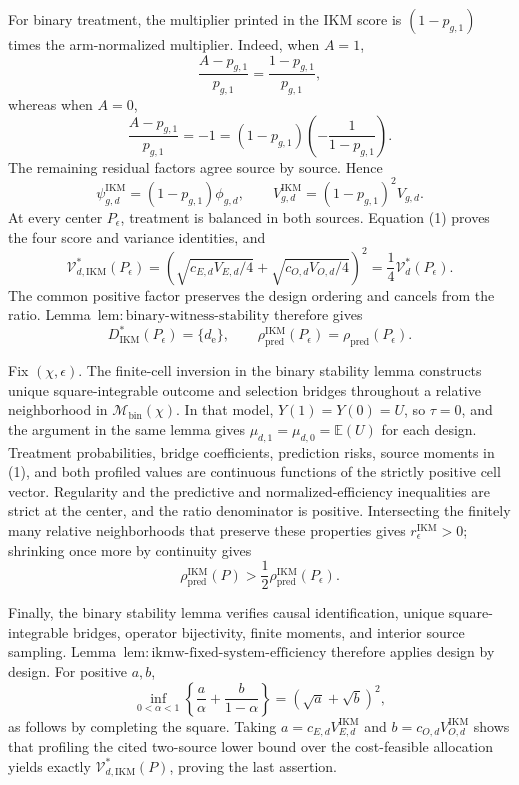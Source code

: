 For binary treatment, the multiplier printed in the IKM score is \((1-p_{g,1})\) times the arm-normalized multiplier. Indeed, when \(A=1\),
\[
 \frac{A-p_{g,1}}{p_{g,1}}=\frac{1-p_{g,1}}{p_{g,1}},
\]
whereas when \(A=0\),
\[
 \frac{A-p_{g,1}}{p_{g,1}}=-1
 =(1-p_{g,1})\left(-\frac1{1-p_{g,1}}\right).
\]
The remaining residual factors agree source by source. Hence
\[
 \psi_{g,d}^{\mathrm{IKM}}=(1-p_{g,1})\phi_{g,d},
 \qquad
 V_{g,d}^{\mathrm{IKM}}=(1-p_{g,1})^2V_{g,d}. \tag{1}
\]
At every center \(P_\epsilon\), treatment is balanced in both sources. Equation (1) proves the four score and variance identities, and
\[
 \mathcal V_{d,\mathrm{IKM}}^*(P_\epsilon)
 =\left(\sqrt{c_{E,d}V_{E,d}/4}
 +\sqrt{c_{O,d}V_{O,d}/4}\right)^2
 =\frac14\mathcal V_d^*(P_\epsilon). \tag{2}
\]
The common positive factor preserves the design ordering and cancels from the ratio. Lemma~\(\mathrm{lem{:}binary\text{-}witness\text{-}stability}\) therefore gives
\[
 D_{\mathrm{IKM}}^*(P_\epsilon)=\{d_{\mathrm e}\},
 \qquad
 \rho_{\mathrm{pred}}^{\mathrm{IKM}}(P_\epsilon)
 =\rho_{\mathrm{pred}}(P_\epsilon). \tag{3}
\]

Fix \((\chi,\epsilon)\). The finite-cell inversion in the binary stability lemma constructs unique square-integrable outcome and selection bridges throughout a relative neighborhood in \(\mathcal M_{\mathrm{bin}}(\chi)\). In that model, \(Y(1)=Y(0)=U\), so \(\tau=0\), and the argument in the same lemma gives \(\mu_{d,1}=\mu_{d,0}=\mathbb E(U)\) for each design. Treatment probabilities, bridge coefficients, prediction risks, source moments in (1), and both profiled values are continuous functions of the strictly positive cell vector. Regularity and the predictive and normalized-efficiency inequalities are strict at the center, and the ratio denominator is positive. Intersecting the finitely many relative neighborhoods that preserve these properties gives \(r_\epsilon^{\mathrm{IKM}}>0\); shrinking once more by continuity gives
\[
 \rho_{\mathrm{pred}}^{\mathrm{IKM}}(P)
 >\frac12\rho_{\mathrm{pred}}^{\mathrm{IKM}}(P_\epsilon).
\]

Finally, the binary stability lemma verifies causal identification, unique square-integrable bridges, operator bijectivity, finite moments, and interior source sampling. Lemma~\(\mathrm{lem{:}ikmw\text{-}fixed\text{-}system\text{-}efficiency}\) therefore applies design by design. For positive \(a,b\),
\[
 \inf_{0<\alpha<1}\left\{\frac a\alpha+\frac b{1-\alpha}\right\}
 =(\sqrt a+\sqrt b)^2,
\]
as follows by completing the square. Taking \(a=c_{E,d}V_{E,d}^{\mathrm{IKM}}\) and \(b=c_{O,d}V_{O,d}^{\mathrm{IKM}}\) shows that profiling the cited two-source lower bound over the cost-feasible allocation yields exactly \(\mathcal V_{d,\mathrm{IKM}}^*(P)\), proving the last assertion.